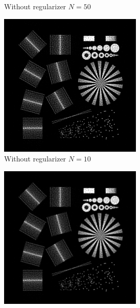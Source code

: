 \documentclass{juliacon}
\begin{document}
\begin{figure}[h]
\begin{subfigure}[b]{.25\textwidth}
                \caption{Without regularizer $N=50$}
                \label{fig:fabiob}
            \end{subfigure}%
            \hfill
            \begin{subfigure}[b]{.25\textwidth}
                \centering
                \includegraphics[width=0.75\textwidth]{figures/resolution_test_chart_no_reg_iter_10.png}
                \caption{Without regularizer $N=10$}
                \label{fig:fabioc}
            \end{subfigure}%
            \hfill
            \begin{subfigure}[b]{.25\textwidth}
                \centering
                \includegraphics[width=0.75\textwidth]{figures/resolution_test_chart_regularizer_008_iter_21.png}

\end{subfigure}
\end{figure}
\end{document}
